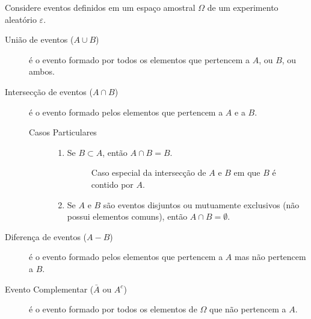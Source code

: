 Considere eventos definidos em um espaço amostral $\Omega$ de um experimento aleatório $\varepsilon$.

\begin{description}
  \item [União de eventos ($A \cup B$)] é o evento formado por todos os elementos que pertencem a $A$, ou  $B$, ou ambos.
    \begin{figure}[H]
      \centering
      
      \caption{}
      \label{fig:1}
    \end{figure} 
  \item [Intersecção de eventos ($A \cap B$)] é o evento formado pelos elementos que pertencem a $A$ e a $B$.
    \begin{figure}[H]
      \centering
      
      \caption{}
      \label{fig:2}
    \end{figure} 
    \begin{description}
      \item[Casos Particulares]
        \begin{enumerate}

          \item Se $B \subset A$, então $A \cap B= B$.

            \begin{figure}[H]
              \centering
              
              \caption{Caso especial da intersecção de $A$ e $B$ em que $B$ é contido por $A$.}
              \label{fig:3}
            \end{figure}

          \item Se $A$ e $B$ são eventos disjuntos ou mutuamente exclusivos (não possui elementos comuns), então $A\cap B = \emptyset$.

            \begin{figure}[H]
              \centering
              
              \caption{}
              \label{fig:4}
            \end{figure}

        \end{enumerate}
    \end{description}
  \item[Diferença de eventos ($A-B$)] é o evento formado pelos elementos que pertencem a $A$ mas não pertencem a $B$.

    \begin{figure}[H]
      \centering
      
      \caption{}
      \label{fig:5}
    \end{figure}
  \item [Evento Complementar ($\bar{A}$ ou $A^c$)] é o evento formado por todos os elementos de $\Omega$ que não pertencem a $A$.
    \begin{description}
      \begin{figure}[H]
        \centering
        
        \caption{}
        \label{fig:6}
      \end{figure}


\end{description}
\end{description}

